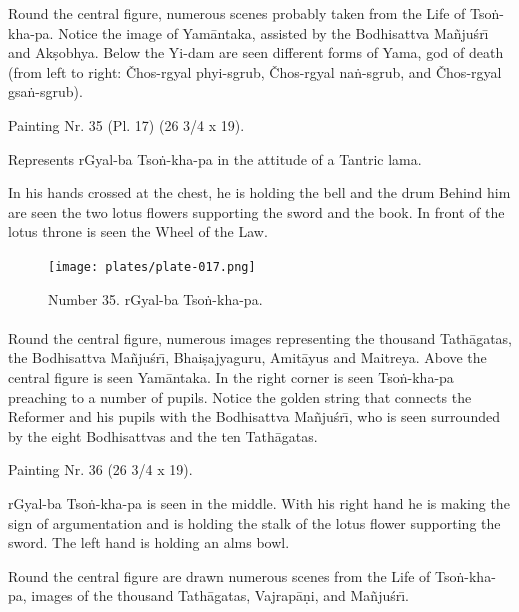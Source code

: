 \documentclass[a4paper, 12pt, oneside]{article}
\begin{document}
Round the central figure, numerous scenes probably taken from the Life of Tso\.{n}-kha-pa. Notice the image of Yam\={a}ntaka, assisted by the Bodhisattva Ma\~{n}ju\'{s}r\={\i} and Ak\d{s}obhya. Below the Yi-dam are seen different forms of Yama, god of death (from left to right: Čhos-rgyal phyi-sgrub, Čhos-rgyal na\.{n}-sgrub, and Čhos-rgyal gsa\.{n}-sgrub).

\bigskip

Painting Nr. 35 (Pl. 17) (26 3/4 x 19).

\bigskip

Represents rGyal-ba Tso\.{n}-kha-pa in the attitude of a Tantric lama.

In his hands crossed at the chest, he is holding the bell and the drum Behind him are seen the two lotus flowers supporting the sword and the book. In front of the lotus throne is seen the Wheel of the Law.

\clearpage
\vspace*{\fill}
\begin{figure}[H]
\centering
\texttt{[image: plates/plate-017.png]}
\caption*{Number 35. rGyal-ba Tso\.{n}-kha-pa.}
\end{figure}
\vspace*{\fill}
\clearpage
\paragraph{}
Round the central figure, numerous images representing the thousand Tath\={a}gatas, the Bodhisattva Ma\~{n}ju\'{s}r\={\i}, Bhai\d{s}ajyaguru, Amit\={a}yus and Maitreya. Above the central figure is seen Yam\={a}ntaka. In the right corner is seen Tso\.{n}-kha-pa preaching to a number of pupils. Notice the golden string that connects the Reformer and his pupils with the Bodhisattva Ma\~{n}ju\'{s}r\={\i}, who is seen surrounded by the eight Bodhisattvas and the ten Tath\={a}gatas.

\bigskip

Painting Nr. 36 (26 3/4 x 19).

\bigskip

rGyal-ba Tso\.{n}-kha-pa is seen in the middle. With his right hand he is making the sign of argumentation and is holding the stalk of the lotus flower supporting the sword. The left hand is holding an alms bowl.

Round the central figure are drawn numerous scenes from the Life of Tso\.{n}-kha-pa, images of the thousand Tath\={a}gatas, Vajrap\={a}\d{n}i, and Ma\~{n}ju\'{s}r\={\i}.
\end{document}
